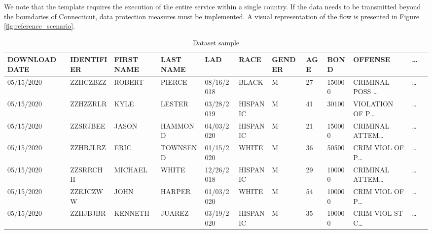 We note that the template requires the execution of the entire service within a single country.
If the data needs to be transmitted beyond the boundaries of Connecticut, data protection measures must be implemented.
A visual representation of the flow is presented in Figure \ref{fig:reference_scenario}.
\begin{table*}[ht!]
  \caption{Dataset sample}
  \label{tab:dataset}
  \centering
  \begin{adjustbox}{max totalsize={.99\linewidth}{\textheight},center}
    \bgroup
    \def\arraystretch{1.5}
    \begin{tabular}{|l|l|l|l|l|l|l|l|l|l|l|l|}
      \hline
      \textbf{DOWNLOAD DATE} & \textbf{IDENTIFIER} & \textbf{FIRST NAME} & \textbf{LAST NAME} & \textbf{LAD} & \textbf{RACE} & \textbf{GENDER} & \textbf{AGE} & \textbf{BOND} & \textbf{OFFENSE}     & \textbf{\dots} \\ \hline
      05/15/2020             & ZZHCZBZZ            & ROBERT              & PIERCE             & 08/16/2018   & BLACK         & M               & 27           & 150000        & CRIMINAL POSS \dots  & \dots          \\ \hline
      05/15/2020             & ZZHZZRLR            & KYLE                & LESTER             & 03/28/2019   & HISPANIC      & M               & 41           & 30100         & VIOLATION OF P\dots  & \dots          \\ \hline
      05/15/2020             & ZZSRJBEE            & JASON               & HAMMOND            & 04/03/2020   & HISPANIC      & M               & 21           & 150000        & CRIMINAL ATTEM\dots  & \dots          \\ \hline
      05/15/2020             & ZZHBJLRZ            & ERIC                & TOWNSEND           & 01/15/2020   & WHITE         & M               & 36           & 50500         & CRIM VIOL OF P\dots  & \dots          \\ \hline
      05/15/2020             & ZZSRRCHH            & MICHAEL             & WHITE              & 12/26/2018   & HISPANIC      & M               & 29           & 100000        & CRIMINAL ATTEM\dots  & \dots          \\ \hline
      05/15/2020             & ZZEJCZWW            & JOHN                & HARPER             & 01/03/2020   & WHITE         & M               & 54           & 100000        & CRIM VIOL OF P\dots  & \dots          \\ \hline
      05/15/2020             & ZZHJBJBR            & KENNETH             & JUAREZ             & 03/19/2020   & HISPANIC      & M               & 35           & 100000        & CRIM VIOL ST C\dots  & \dots          \\ \hline

\end{tabular}
\end{adjustbox}
\end{table*}
